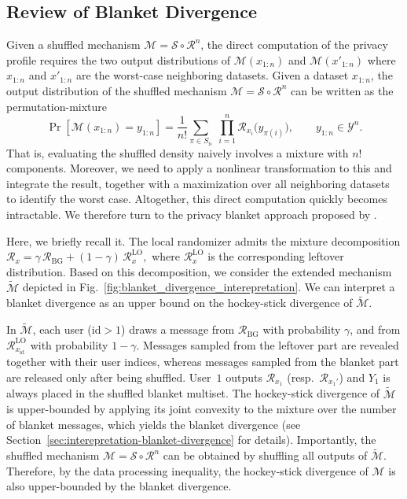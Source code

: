 \documentclass{article}
\theoremstyle{plain}
\theoremstyle{definition}
\begin{document}
\subsection{Review of Blanket Divergence}
\label{sec:review_blanket_divergence}
Given a shuffled mechanism $\mathcal M=\mathcal S\circ \mathcal R^n$, the direct computation of the privacy profile requires the two output distributions of $\mathcal M(x_{1:n})$ and $\mathcal M(x'_{1:n})$ where $x_{1:n}$ and $x'_{1:n}$ are the worst-case neighboring datasets.
Given a dataset $x_{1:n}$, the output distribution of the shuffled mechanism $\mathcal M=\mathcal S\circ \mathcal R^n$ can be written as the permutation-mixture
\[
\Pr[\mathcal M(x_{1:n}) = y_{1:n}]
=
\frac{1}{n!}\sum_{\pi\in S_n}\;
\prod_{i=1}^n \mathcal R_{x_i}\bigl(y_{\pi(i)}\bigr),
\qquad y_{1:n}\in\mathcal Y^n.
\]
That is, evaluating the shuffled density naively involves a mixture with $n!$ components.
Moreover, we need to apply a nonlinear transformation to this and integrate the result, together with a maximization over all neighboring datasets to identify the worst case.
Altogether, this direct computation quickly becomes intractable.
We therefore turn to the privacy blanket approach proposed by \citet{ballePrivacyBlanketShuffle2019}.



Here, we briefly recall it.
The local randomizer admits the mixture decomposition
$
\mathcal R_x
=
\gamma\,\mathcal R_{\mathrm{BG}}
+
(1-\gamma)\,\mathcal R_x^{\mathrm{LO}},
$
where $\mathcal R_x^{\mathrm{LO}}$ is the corresponding leftover distribution.
Based on this decomposition, we consider the extended mechanism
$\widetilde{\mathcal M}$ depicted in Fig.~\ref{fig:blanket_divergence_interepretation}.
We can interpret a blanket divergence as an upper bound on the hockey-stick divergence of $\widetilde{\mathcal M}$.



In $\widetilde{\mathcal M}$, each user ($\mathrm{id}> 1$) draws a message from $\mathcal R_{\mathrm{BG}}$ with probability $\gamma$, and from $\mathcal R_{x_\mathrm{id}}^{\mathrm{LO}}$ with probability $1-\gamma$.
Messages sampled from the leftover part are revealed together with
their user indices, whereas messages sampled from the blanket part are released only after being shuffled.
User~$1$ outputs $\mathcal R_{x_1}$ (resp.\ $\mathcal R_{x_1'}$) and $Y_1$ is always placed in the shuffled blanket multiset.
The hockey-stick divergence of $\widetilde{\mathcal M}$ is upper-bounded by applying its joint convexity to the mixture over the number of blanket messages, which yields the blanket divergence (see Section~\ref{sec:interepretation-blanket-divergence} for details).
Importantly, the shuffled mechanism $\mathcal M=\mathcal S\circ\mathcal R^n$ can be obtained by shuffling all outputs of $\widetilde{\mathcal M}$.
Therefore, by the data processing inequality, the hockey-stick divergence of $\mathcal M$ is also upper-bounded by the blanket divergence.
\end{document}
